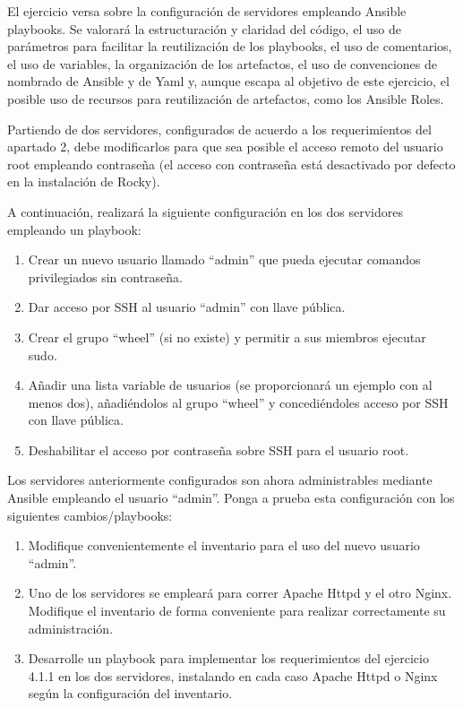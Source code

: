 El ejercicio versa sobre la configuración de servidores empleando Ansible playbooks. Se valorará la estructuración y claridad del código, el uso de parámetros para facilitar la reutilización de los playbooks, el uso de comentarios, el uso de variables, la organización de los artefactos, el uso de convenciones de nombrado de Ansible y de Yaml y, aunque escapa al objetivo de este ejercicio, el posible uso de recursos para reutilización de artefactos, como los Ansible Roles.

Partiendo de dos servidores, configurados de acuerdo a los requerimientos del apartado 2, debe modificarlos para que sea posible el acceso remoto del usuario root empleando contraseña (el acceso con contraseña está desactivado por defecto en la instalación de Rocky).

A continuación, realizará la siguiente configuración en los dos servidores empleando un playbook:
\begin{enumerate}
  \item Crear un nuevo usuario llamado “admin” que pueda ejecutar comandos privilegiados sin contraseña.
  \item Dar acceso por SSH al usuario “admin” con llave pública.
  \item Crear el grupo “wheel” (si no existe) y permitir a sus miembros ejecutar sudo.
  \item Añadir una lista variable de usuarios (se proporcionará un ejemplo con al menos dos), añadiéndolos al grupo “wheel” y concediéndoles acceso por SSH con llave pública.
  \item Deshabilitar el acceso por contraseña sobre SSH para el usuario root.
\end{enumerate}

Los servidores anteriormente configurados son ahora administrables mediante Ansible empleando el usuario “admin”. Ponga a prueba esta configuración con los siguientes cambios/playbooks:
\begin{enumerate}
  \item Modifique convenientemente el inventario para el uso del nuevo usuario “admin”.
  \item Uno de los servidores se empleará para correr Apache Httpd y el otro Nginx. Modifique el inventario de forma conveniente para realizar correctamente su administración.
  \item Desarrolle un playbook para implementar los requerimientos del ejercicio 4.1.1 en los dos servidores, instalando en cada caso Apache Httpd o Nginx según la configuración del inventario.
\end{enumerate}

